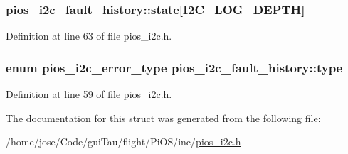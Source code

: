 \hypertarget{structpios__i2c__fault__history_aac4337b23aad02daaa33f5be193ea859}{
\subsubsection[{state}]{ pios\-\_\-i2c\-\_\-fault\-\_\-history\-::state\mbox{[}I2\-C\-\_\-\-L\-O\-G\-\_\-\-D\-E\-P\-T\-H\mbox{]}}}\label{structpios__i2c__fault__history_aac4337b23aad02daaa33f5be193ea859}


Definition at line 63 of file pios\-\_\-i2c.\-h.

\hypertarget{structpios__i2c__fault__history_af6d40156bcea64ae98966b65f779dccb}{
\subsubsection[{type}]{\setlength{\rightskip}{0pt plus 5cm}enum {\bf pios\-\_\-i2c\-\_\-error\-\_\-type} pios\-\_\-i2c\-\_\-fault\-\_\-history\-::type}}\label{structpios__i2c__fault__history_af6d40156bcea64ae98966b65f779dccb}


Definition at line 59 of file pios\-\_\-i2c.\-h.



The documentation for this struct was generated from the following file\-:\begin{DoxyCompactItemize}
\item 
/home/jose/\-Code/gui\-Tau/flight/\-Pi\-O\-S/inc/\hyperlink{_pi_o_s_2inc_2pios__i2c_8h}{pios\-\_\-i2c.\-h}\end{DoxyCompactItemize}
